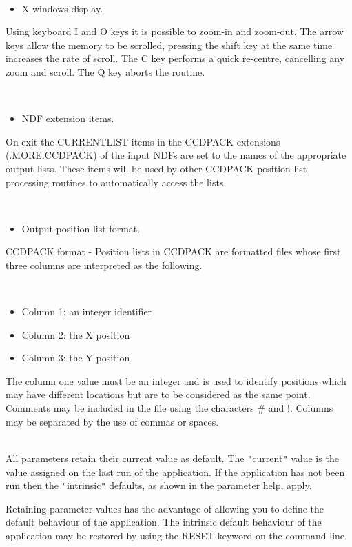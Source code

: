 \documentclass[twoside,11pt]{article}
\renewcommand{\_}{\texttt{\symbol{95}}}
\newcommand{\qt}[1]{{\tt "}#1{\tt "}}
\newcommand{\sstdiytopic}[2]{\item[#1:] \mbox{} \\[1.3ex] #2}
\newcommand{\sstitemlist}[1]{
  \mbox{} \\
  \vspace{-3.5ex}
  \begin{itemize}
     #1
  \end{itemize}
}
\newcommand{\sstitem}{\item}
\newcommand{\sstdiytopic}[2]{\item[{#1}] #2 }
\newcommand{\sstitemlist}[1]{
      \begin{itemize}
         #1
      \end{itemize}
      \\
   }
\newcommand{\sstitem}{\item}
\begin{document}
{{      \sstitemlist{

         \sstitem
         X windows display.

      }
       Using keyboard I and O keys it is possible to zoom-in and
       zoom-out. The arrow keys allow the memory to be scrolled,
       pressing the shift key at the same time increases the rate of
       scroll. The C key performs a quick re-centre, cancelling any
       zoom and scroll. The Q key aborts the routine.

      \sstitemlist{

         \sstitem
         NDF extension items.

      }
        On exit the CURRENT\_LIST items in the CCDPACK extensions
        (.MORE.CCDPACK) of the input NDFs are set to the names of the
        appropriate output lists. These items will be used by other
        CCDPACK position list processing routines to automatically
        access the lists.

      \sstitemlist{

         \sstitem
         Output position list format.

      }
        CCDPACK format - Position lists in CCDPACK are formatted files
        whose first three columns are interpreted as the following.

      \sstitemlist{

         \sstitem
              Column 1: an integer identifier

         \sstitem
              Column 2: the X position

         \sstitem
              Column 3: the Y position

      }
        The column one value must be an integer and is used to identify
        positions which may have different locations but are to be
        considered as the same point. Comments may be included in the
        file using the characters \# and !. Columns may be separated by
        the use of commas or spaces.
   }
   \sstdiytopic{
      Behaviour of parameters
   } {
      All parameters retain their current value as default. The
      \qt{current} value is the value assigned on the last run of the
      application. If the application has not been run then the
      \qt{intrinsic} defaults, as shown in the parameter help, apply.

      Retaining parameter values has the advantage of allowing you to
      define the default behaviour of the application.  The intrinsic
      default behaviour of the application may be restored by using the
      RESET keyword on the command line.

}}
\end{document}
